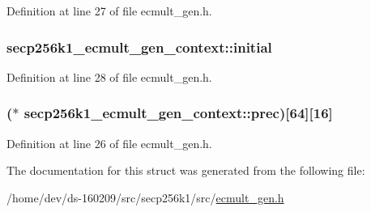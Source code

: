 Definition at line 27 of file ecmult\+\_\+gen.\+h.

\hypertarget{structsecp256k1__ecmult__gen__context_a1ebfe4de83e25248ea9d989d06c9b069}{}
\subsubsection[{initial}]{ secp256k1\+\_\+ecmult\+\_\+gen\+\_\+context\+::initial}\label{structsecp256k1__ecmult__gen__context_a1ebfe4de83e25248ea9d989d06c9b069}


Definition at line 28 of file ecmult\+\_\+gen.\+h.

\hypertarget{structsecp256k1__ecmult__gen__context_ad1ebc8daeace10a8d646f89bbdf32882}{}
\subsubsection[{prec}]{($\ast$ secp256k1\+\_\+ecmult\+\_\+gen\+\_\+context\+::prec)\mbox{[}64\mbox{]}\mbox{[}16\mbox{]}}\label{structsecp256k1__ecmult__gen__context_ad1ebc8daeace10a8d646f89bbdf32882}


Definition at line 26 of file ecmult\+\_\+gen.\+h.



The documentation for this struct was generated from the following file\+:\begin{DoxyCompactItemize}
\item 
/home/dev/ds-\/160209/src/secp256k1/src/\hyperlink{ecmult__gen_8h}{ecmult\+\_\+gen.\+h}\end{DoxyCompactItemize}
